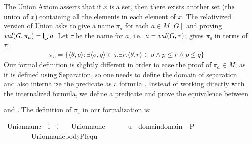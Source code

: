 The Union Axiom asserts that if $x$ is a set, then there exists
another set (the union of $x$) containing all the elements in each
element of $x$. The relativized version of Union asks to give a name
$\pi_a$ for each $a\in M[G]$ and proving $\operatorname{\mathit{val}}(G,\pi_a)=\mathop{\textstyle\bigcup} a$.
Let $\tau$ be the name for $a$, i.e.\ $a=\operatorname{\mathit{val}}(G,\tau)$; 
\citet{kunen2011set} gives $\pi_a$ in terms of $\tau$:
\begin{align*}
  \pi_a = \{\langle\theta,p \rangle :  %
\exists \langle\sigma,q\rangle  \in \tau .
 \exists r . \langle \theta,r\rangle \in \sigma \wedge
    p\leqslant r \wedge p \leqslant q \}
\end{align*}
Our formal definition is slightly different in order to ease the proof
of $\pi_a \in M$; as it is defined using Separation, so one needs to
define the domain of separation and also internalize the predicate as
a formula
. Instead of
working directly with the internalized formula, we define a predicate
 and prove the equivalence between
\begin{center}
\end{center}
and
. The
definition of $\pi_a$ in our formalization is:
\begin{isabelle}
\isamarkupfalse%
\ Union{\isacharunderscore}name\ {\isacharcolon}{\isacharcolon}\ {\isachardoublequoteopen}i\ {\isasymRightarrow}\ i{\isachardoublequoteclose}\ \isanewline
\ \ {\isachardoublequoteopen}Union{\isacharunderscore}name{\isacharparenleft}{\isasymtau}{\isacharparenright}\ {\isacharequal}{\isacharequal}\ \isanewline
\ \ \ \ {\isacharbraceleft}u\ {\isasymin}\ domain{\isacharparenleft}{\isasymUnion}{\isacharparenleft}domain{\isacharparenleft}{\isasymtau}{\isacharparenright}{\isacharparenright}{\isacharparenright}\ {\isasymtimes}\ P\ {\isachardot}\isanewline
\ \ \ \  \ \ \ \ Union{\isacharunderscore}name{\isacharunderscore}body{\isacharparenleft}P{\isacharcomma}leq{\isacharcomma}{\isasymtau}{\isacharcomma}u{\isacharparenright}{\isacharbraceright}{\isachardoublequoteclose}
\end{isabelle}

